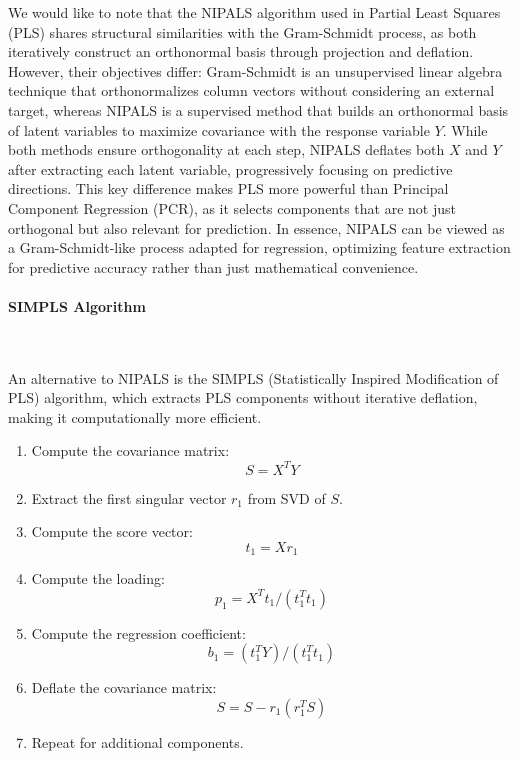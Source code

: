 \documentclass[11pt,twoside,a4paper]{article}
\begin{document}
We would like to note that the NIPALS algorithm used in Partial Least Squares (PLS) shares structural similarities with the Gram-Schmidt process, as both iteratively construct an orthonormal basis through projection and deflation. However, their objectives differ: Gram-Schmidt is an unsupervised linear algebra technique that orthonormalizes column vectors without considering an external target, whereas NIPALS is a supervised method that builds an orthonormal basis of latent variables to maximize covariance with the response variable \( Y \). While both methods ensure orthogonality at each step, NIPALS deflates both \( X \) and \( Y \) after extracting each latent variable, progressively focusing on predictive directions. This key difference makes PLS more powerful than Principal Component Regression (PCR), as it selects components that are not just orthogonal but also relevant for prediction. In essence, NIPALS can be viewed as a Gram-Schmidt-like process adapted for regression, optimizing feature extraction for predictive accuracy rather than just mathematical convenience.

\paragraph {SIMPLS Algorithm} \ \

An alternative to NIPALS is the SIMPLS (Statistically Inspired Modification of PLS) algorithm, which extracts PLS components without iterative deflation, making it computationally more efficient.

\begin{enumerate}
    \item Compute the covariance matrix:
        \begin{equation}
        S = X^T Y
        \end{equation}
    \item Extract the first singular vector \( r_1 \) from SVD of \( S \).
    \item Compute the score vector:
        \begin{equation}
        t_1 = Xr_1
        \end{equation}
    \item Compute the loading:
        \begin{equation}
        p_1 = X^T t_1 / (t_1^T t_1)
        \end{equation}
    \item Compute the regression coefficient:
        \begin{equation}
        b_1 = (t_1^T Y) / (t_1^T t_1)
        \end{equation}
    \item Deflate the covariance matrix:
        \begin{equation}
        S = S - r_1 (r_1^T S)
        \end{equation}
    \item Repeat for additional components.
\end{enumerate}
\end{document}
